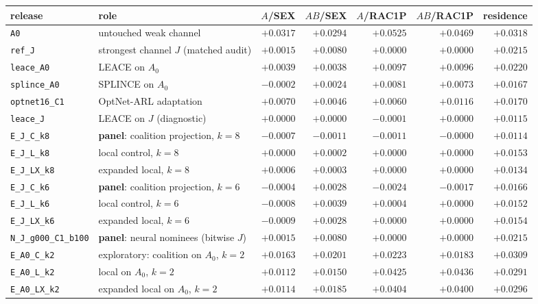 \begin{tabular}{@{}l l r r r r r@{}}
\toprule
release & role & $A$/SEX & $AB$/SEX & $A$/RAC1P & $AB$/RAC1P & residence \\
\midrule
\texttt{A0} & untouched weak channel & $+0.0317$ & $+0.0294$ & $+0.0525$ & $+0.0469$ & $+0.0318$ \\
\texttt{ref\_J} & strongest channel $J$ (matched audit) & $+0.0015$ & $+0.0080$ & $+0.0000$ & $+0.0000$ & $+0.0215$ \\
\texttt{leace\_A0} & LEACE on $A_0$ & $+0.0039$ & $+0.0038$ & $+0.0097$ & $+0.0096$ & $+0.0220$ \\
\texttt{splince\_A0} & SPLINCE on $A_0$ & $-0.0002$ & $+0.0024$ & $+0.0081$ & $+0.0073$ & $+0.0167$ \\
\texttt{optnet16\_C1} & OptNet-ARL adaptation & $+0.0070$ & $+0.0046$ & $+0.0060$ & $+0.0116$ & $+0.0170$ \\
\texttt{leace\_J} & LEACE on $J$ (diagnostic) & $+0.0000$ & $+0.0000$ & $-0.0001$ & $+0.0000$ & $+0.0115$ \\
\midrule
\texttt{E\_J\_C\_k8} & \textbf{panel}: coalition projection, $k{=}8$ & $-0.0007$ & $-0.0011$ & $-0.0011$ & $-0.0000$ & $+0.0114$ \\
\texttt{E\_J\_L\_k8} & local control, $k{=}8$ & $+0.0000$ & $+0.0002$ & $+0.0000$ & $+0.0000$ & $+0.0153$ \\
\texttt{E\_J\_LX\_k8} & expanded local, $k{=}8$ & $+0.0006$ & $+0.0003$ & $+0.0000$ & $+0.0000$ & $+0.0134$ \\
\texttt{E\_J\_C\_k6} & \textbf{panel}: coalition projection, $k{=}6$ & $-0.0004$ & $+0.0028$ & $-0.0024$ & $-0.0017$ & $+0.0166$ \\
\texttt{E\_J\_L\_k6} & local control, $k{=}6$ & $-0.0008$ & $+0.0039$ & $+0.0004$ & $+0.0000$ & $+0.0152$ \\
\texttt{E\_J\_LX\_k6} & expanded local, $k{=}6$ & $-0.0009$ & $+0.0028$ & $+0.0000$ & $+0.0000$ & $+0.0154$ \\
\texttt{N\_J\_g000\_C1\_b100} & \textbf{panel}: neural nominees (bitwise $J$) & $+0.0015$ & $+0.0080$ & $+0.0000$ & $+0.0000$ & $+0.0215$ \\
\midrule
\texttt{E\_A0\_C\_k2} & exploratory: coalition on $A_0$, $k{=}2$ & $+0.0163$ & $+0.0201$ & $+0.0223$ & $+0.0183$ & $+0.0309$ \\
\texttt{E\_A0\_L\_k2} & local on $A_0$, $k{=}2$ & $+0.0112$ & $+0.0150$ & $+0.0425$ & $+0.0436$ & $+0.0291$ \\
\texttt{E\_A0\_LX\_k2} & expanded local on $A_0$, $k{=}2$ & $+0.0114$ & $+0.0185$ & $+0.0404$ & $+0.0400$ & $+0.0296$ \\
\bottomrule
\end{tabular}
